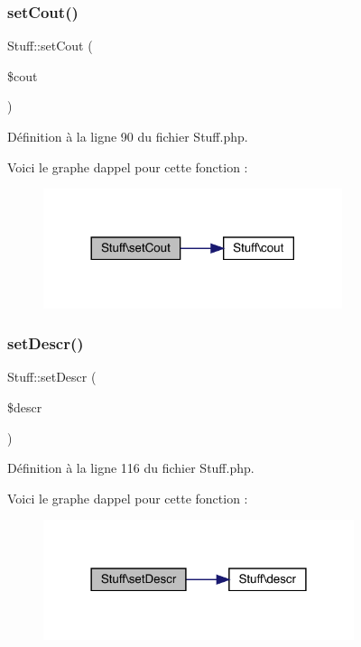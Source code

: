 \subsubsection{\texorpdfstring{set\+Cout()}{setCout()}}
{\footnotesize\ttfamily Stuff\+::set\+Cout (\begin{DoxyParamCaption}\item[{}]{\$cout }\end{DoxyParamCaption})}



Définition à la ligne 90 du fichier Stuff.\+php.

Voici le graphe d\textquotesingle{}appel pour cette fonction \+:\nopagebreak
\begin{figure}[H]
\begin{center}
\leavevmode
\includegraphics[width=248pt]{class_stuff_ae2d819b501f4b8bd815e6318549f42fa_cgraph}
\end{center}
\end{figure}
\mbox{\label{class_stuff_ab1d52c190f51753afd58ef9b54060c94}} 
\subsubsection{\texorpdfstring{set\+Descr()}{setDescr()}}
{\footnotesize\ttfamily Stuff\+::set\+Descr (\begin{DoxyParamCaption}\item[{}]{\$descr }\end{DoxyParamCaption})}



Définition à la ligne 116 du fichier Stuff.\+php.

Voici le graphe d\textquotesingle{}appel pour cette fonction \+:\nopagebreak
\begin{figure}[H]
\begin{center}
\leavevmode
\includegraphics[width=258pt]{class_stuff_ab1d52c190f51753afd58ef9b54060c94_cgraph}
\end{center}
\end{figure}
\mbox{\label{class_stuff_a71d02dca0478b89b261d94cc53cde5de}} 
